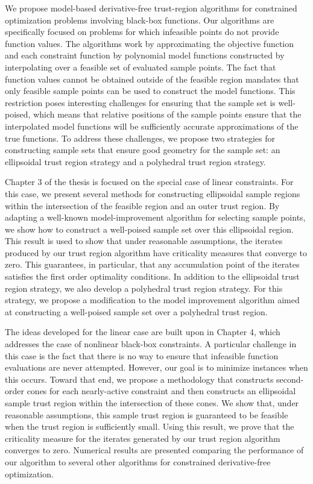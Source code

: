 
We propose model-based derivative-free trust-region algorithms for constrained optimization problems involving black-box functions.
Our algorithms are specifically focused on problems for which infeasible points do not provide function values.
The algorithms work by approximating the objective function and each constraint function by polynomial model functions 
constructed by interpolating over a feasible set of evaluated sample points.
The fact that function values cannot be obtained outside of the feasible region mandates that 
only feasible sample points can be used to construct the model functions.
This restriction poses interesting challenges for ensuring that the sample set is well-poised, 
which means that relative positions of the sample points ensure that the interpolated model functions will be
sufficiently accurate approximations of the true functions.
To address these challenges, we propose two strategies for constructing sample sets that ensure good geometry for the sample set: 
an ellipsoidal trust region strategy and a polyhedral trust region strategy.   

Chapter 3 of the thesis is focused on the special case of linear constraints.
For this case, we present several methods for constructing ellipsoidal sample regions within the intersection of the feasible region and an outer trust region.
By adapting a well-known model-improvement algorithm for selecting sample points,
we show how to construct a well-poised sample set over this ellipsoidal region.
This result is used to show that under reasonable assumptions,  
the iterates produced by our trust region algorithm have criticality measures that converge to zero.
This guarantees, in particular, that any accumulation point of the iterates satisfies the first order optimality conditions.
In addition to the ellipsoidal trust region strategy, we also develop a polyhedral trust region strategy.
For this strategy, we propose a modification to the model improvement algorithm aimed at constructing a well-poised sample set over 
a polyhedral trust region.

The ideas developed for the linear case are built upon in Chapter 4, which addresses the case of nonlinear black-box constraints.
A particular challenge in this case is the fact that there is no way to ensure that infeasible function evaluations are never attempted.
However, our goal is to minimize instances when this occurs.
Toward that end, we propose a methodology that constructs second-order cones for each nearly-active constraint 
and then constructs an ellipsoidal sample trust region within the intersection of these cones.
We show that, under reasonable assumptions, this sample trust region is guaranteed to be feasible when the trust region is sufficiently small.
Using this result, we prove that the criticality measure for the iterates generated by our trust region algorithm converges to zero.
Numerical results are presented comparing the performance of our algorithm to several other algorithms for constrained derivative-free optimization.
 
